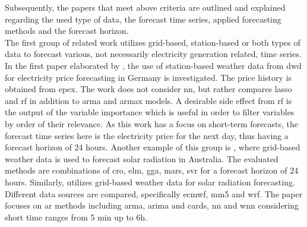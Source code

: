 Subsequently, the papers that meet above criteria are outlined and explained regarding the used type of data, the forecast time series, applied forecasting methods and the forecast horizon.\\

The first group of related work utilizes grid-based, station-based or both types of data to forecast various, not necessarily electricity generation related, time series. In the first paper elaborated by , the use of station-based weather data from \gls{dwd} for electricity price forecasting in Germany is investigated. The price history is obtained from \gls{epex}. The work does not consider \gls{nn}, but rather compares \gls{lasso} and \gls{rf} in addition to \gls{arma} and \gls{armax} models. A desirable side effect from \gls{rf} is the output of the variable importance which is useful in order to filter variables by order of their relevance. As this work has a focus on short-term forecasts, the forecast time series here is the electricity price for the next day, thus having a forecast horizon of 24 hours. Another example of this group is , where grid-based weather data is used to forecast solar radiation in Australia. The evaluated methods are combinations of \gls{cro}, \gls{elm}, \gls{gga}, \gls{mars}, \gls{svr} for a forecast horizon of 24 hours. Similarly,  utilizes grid-based weather data for solar radiation forecasting. Different data sources are compared, specifically \gls{ecmwf}, \gls{mm5} and \gls{wrf}. The paper focuses on \gls{ar} methods including \gls{arma}, \gls{arima} and \gls{cards}, \gls{nn} and \gls{wnn} considering short time ranges from 5 min up to 6h.\\

